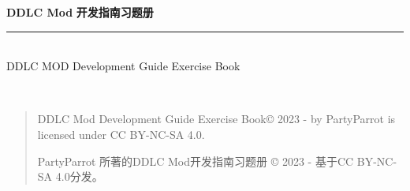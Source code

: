 \documentclass[../Main.tex]{subfiles}
\begin{document}
\thispagestyle{empty}

\begin{titlepage}{




\noindent\begin{minipage}{\textwidth}
\raggedright
{\fontsize{60pt}{1.2} \bfseries DDLC Mod}
\newline
\newline
{\fontsize{50pt}{1.2} \bfseries 开发指南习题册}
\noindent\rule[-1ex]{\textwidth}{5pt}\\[2.5ex]
\Large {DDLC MOD Development Guide Exercise Book\newline} \hfill
\newline
{\bfseries {}}
\end{minipage}


\newpage
\thispagestyle{empty}
~\vfill
\begin{quote}\footnotesize\large
\noindent DDLC Mod Development Guide Exercise Book{\copyright} 2023 - {\the\year} by PartyParrot is licensed under CC BY-NC-SA 4.0.

\noindent PartyParrot 所著的DDLC Mod开发指南习题册 {\copyright} 2023 - {\the\year}基于CC BY-NC-SA 4.0分发。
\end{quote}
}
\end{titlepage}
\end{document}
